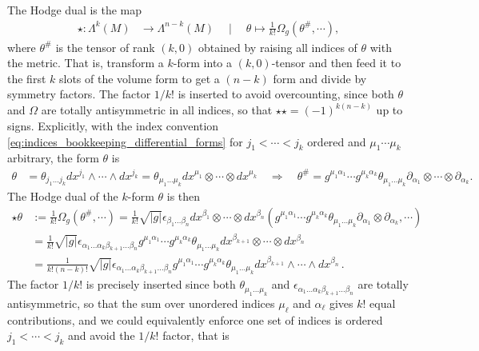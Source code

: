 \begin{mytheorem}
The Hodge dual is the map
\begin{align}
    \star: \Lambda^k (M) &\to \Lambda^{n-k} (M) \quad \mid \quad \theta \mapsto \tfrac{1}{k!}\Omega_g(\theta^{\#}, \cdots),
\end{align}
where \(\theta^{\#}\) is the tensor of rank $(k,0)$ obtained by raising all indices of $\theta$ with the metric.
That is, transform a $k$-form into a $(k,0)$-tensor and then feed it to the first $k$ slots of the volume form to get a $(n-k)$ form and divide by symmetry factors.
The factor $1/k!$ is inserted to avoid overcounting, since both $\theta$ and $\Omega$ are totally antisymmetric in all indices, so that $\star\star = (-1)^{k(n-k)}$ up to signs.
%
Explicitly, with the index convention \eqref{eq:indices_bookkeeping_differential_forms} for {\small $j_1<\cdots<j_k$} ordered and {\small $\mu_1\cdots\mu_k$} arbitrary, the form $\theta$ is
{\small
\begin{align}
    \theta &= \theta_{j_1 \dots j_k} dx^{j_1} \wedge \cdots \wedge dx^{j_k} = \theta_{\mu_1 \dots \mu_k} dx^{\mu_1} \otimes \cdots \otimes dx^{\mu_k}\quad \Rightarrow \quad \theta^{\#} = g^{\mu_1 \alpha_1} \cdots g^{\mu_k \alpha_k} \theta_{\mu_1 \dots \mu_k} \partial_{\alpha_1}\otimes \cdots \otimes \partial_{\alpha_k}.
\end{align}
}
The Hodge dual of the \(k\)-form \(\theta\) is then 
{\small
\begin{align}\label{eq:hodge_dual_first_exp}
    \star \theta &:= \tfrac{1}{k!}\Omega_g(\theta^{\#}, \cdots)
    = \tfrac{1}{k!}\sqrt{|g|}\epsilon_{\beta_1\dots \beta_n} dx^{\beta_1} \otimes \cdots \otimes dx^{\beta_n} \left( g^{\mu_1 \alpha_1} \cdots g^{\mu_k \alpha_k} \theta_{\mu_1 \dots \mu_k} \partial_{\alpha_1}\otimes \partial_{\alpha_k}, \cdots \right)
    \\
    &= \tfrac{1}{k!}\sqrt{|g|}\epsilon_{\alpha_1\dots \alpha_k\beta_{k+1}\dots \beta_n} g^{\mu_1 \alpha_1} \cdots g^{\mu_k \alpha_k} \theta_{\mu_1 \dots \mu_k} dx^{\beta_{k+1}} \otimes \cdots \otimes dx^{\beta_n}
    \\
    &= \frac{1}{k!(n-k)!} \sqrt{|g|}\epsilon_{\alpha_1\dots \alpha_k\beta_{k+1}\dots \beta_n} g^{\mu_1 \alpha_1} \cdots g^{\mu_k \alpha_k} \theta_{\mu_1 \dots \mu_k} dx^{\beta_{k+1}} \wedge \cdots \wedge dx^{\beta_n}\,.
\end{align}}
The factor $1/k!$ is precisely inserted since both $\theta_{\mu_1 \dots \mu_k}$ and $\epsilon_{\alpha_1\dots \alpha_k\beta_{k+1}\dots \beta_n}$ are totally antisymmetric, so that the sum over unordered indices $\mu_\ell$ and $\alpha_\ell$ gives $k!$ equal contributions, and we could equivalently enforce one set of indices is ordered $j_1 < \cdots < j_k$ and avoid the $1/k!$ factor, that is

\end{mytheorem}
